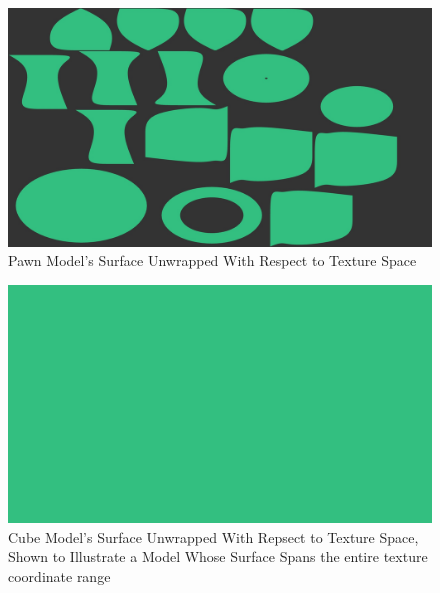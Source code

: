 \documentclass[a4paper, 12pt]{article}
\begin{document}
\begin{figure}[h]
	\centering
	\includegraphics[width=1.0\textwidth]{textureSpace.jpg}
	\caption{Pawn Model's Surface Unwrapped With Respect to Texture Space}
	\label{pic:texSpace}
\end{figure}

\begin{figure}[h]
	\centering
	\includegraphics[width=1.0\textwidth]{cubeTSpace.jpg}
	\caption{Cube Model's Surface Unwrapped With Repsect to Texture Space, Shown to Illustrate a Model Whose Surface Spans the entire texture coordinate range}
	\label{pic:cubeTSpace}
\end{figure}
\end{document}
